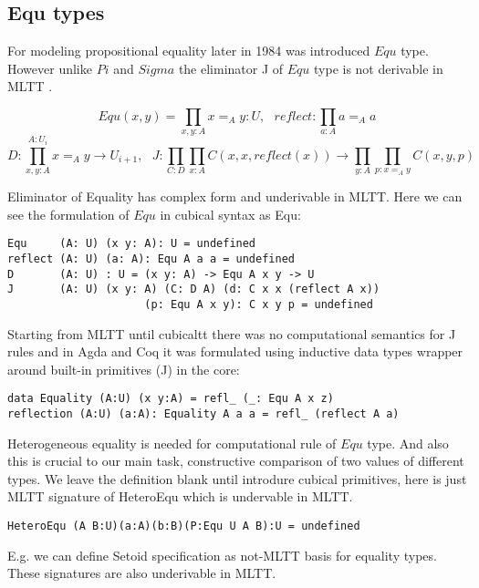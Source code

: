 \documentclass{article}
\begin{document}
\subsection{Equ types}

For modeling propositional equality later in 1984 was introduced $Equ$ type. \cite{Lof84}
However unlike $Pi$ and $Sigma$ the eliminator J of $Equ$ type is
not derivable in MLTT \cite{Hofmann96, Mortberg17, HoTT}.

$$Equ(x,y) = \prod_{x,y:A} x =_A y : U,\ \ \ 
  reflect : \prod_{a:A} a =_A a$$
$$D : \prod_{x,y:A}^{A:U_i} x =_A y \rightarrow U_{i+1},\ \ \ 
  J : \prod_{C: D} \prod_{x:A} C(x,x,reflect(x)) \rightarrow \prod_{y:A} \prod_{p:x=_A y} C(x,y,p)$$

Eliminator of Equality has complex form and underivable in MLTT.
Here we can see the formulation of $Equ$ in cubical syntax as Equ:

\begin{lstlisting}[mathescape=true]
Equ     (A: U) (x y: A): U = undefined
reflect (A: U) (a: A): Equ A a a = undefined
D       (A: U) : U = (x y: A) -> Equ A x y -> U
J       (A: U) (x y: A) (C: D A) (d: C x x (reflect A x))
                     (p: Equ A x y): C x y p = undefined
\end{lstlisting}

Starting from MLTT until cubicaltt there was no computational semantics
for J rules and in Agda and Coq it was formulated using inductive data types
wrapper around built-in primitives (J) in the core:

\begin{lstlisting}[mathescape=true]
data Equality (A:U) (x y:A) = refl_ (_: Equ A x z)
reflection (A:U) (a:A): Equality A a a = refl_ (reflect A a)
\end{lstlisting}

Heterogeneous equality is needed for computational rule of $Equ$ type.
And also this is crucial to our main task, constructive
comparison of two values of different types. We leave the definition blank
until introdure cubical primitives, here is just MLTT signature of HeteroEqu
which is undervable in MLTT.

\begin{lstlisting}[mathescape=true]
HeteroEqu (A B:U)(a:A)(b:B)(P:Equ U A B):U = undefined
\end{lstlisting}

E.g. we can define Setoid specification \cite{Bishop67} as not-MLTT basis
for equality types. These signatures are also underivable in MLTT.
\end{document}
